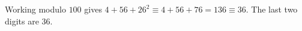 Working modulo $100$ gives $4+56+26^2\equiv4+56+76=136\equiv36$. The last two digits are $\boxed{36}$.
